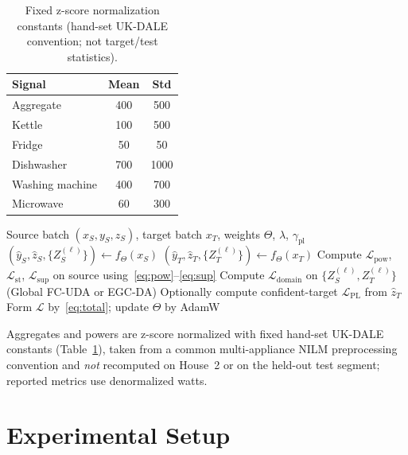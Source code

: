\documentclass[journal]{IEEEtran}
\begin{document}
\begin{table}[!t]
\caption{Fixed z-score normalization constants (hand-set UK-DALE convention; not target/test statistics).}
\label{tab:norm}
\centering
\scriptsize
\begin{tabular}{@{}lcc@{}}
\toprule
Signal & Mean & Std \\
\midrule
Aggregate & 400 & 500 \\
Kettle & 100 & 500 \\
Fridge & 50 & 50 \\
Dishwasher & 700 & 1000 \\
Washing machine & 400 & 700 \\
Microwave & 60 & 300 \\
\bottomrule
\end{tabular}
\end{table}

\begin{algorithm}[!t]
\caption{One MATUDA training step (unsupervised DA; after warmup)}
\label{alg:train}
\begin{algorithmic}[1]
\REQUIRE Source batch $(x_S,y_S,z_S)$, target batch $x_T$, weights $\Theta$, $\lambda$, $\gamma_{\mathrm{pl}}$
\STATE $(\hat{y}_S,\hat{z}_S,\{Z_S^{(\ell)}\})\leftarrow f_\Theta(x_S)$
\STATE $(\hat{y}_T,\hat{z}_T,\{Z_T^{(\ell)}\})\leftarrow f_\Theta(x_T)$ 
\STATE Compute $\mathcal{L}_{\mathrm{pow}}$, $\mathcal{L}_{\mathrm{st}}$, $\mathcal{L}_{\mathrm{sup}}$ on source using~\eqref{eq:pow}--\eqref{eq:sup}
\STATE Compute $\mathcal{L}_{\mathrm{domain}}$ on $\{Z_S^{(\ell)},Z_T^{(\ell)}\}$ (Global FC-UDA or EGC-DA)
\STATE Optionally compute confident-target $\mathcal{L}_{\mathrm{PL}}$ from $\hat{z}_T$
\STATE Form $\mathcal{L}$ by~\eqref{eq:total}; update $\Theta$ by AdamW
\end{algorithmic}
\end{algorithm}

Aggregates and powers are z-score normalized with fixed hand-set UK-DALE constants (Table~\ref{tab:norm}), taken from a common multi-appliance NILM preprocessing convention and \emph{not} recomputed on House~2 or on the held-out test segment; reported metrics use denormalized watts.

\section{Experimental Setup}
\end{document}
